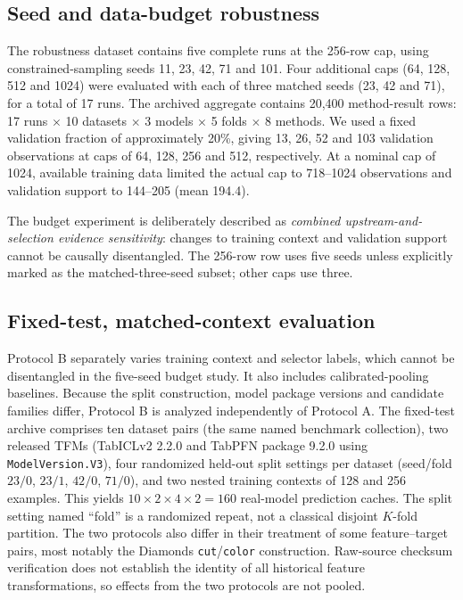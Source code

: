 \documentclass[a4paper,fleqn]{cas-sc}
\begin{document}
\subsection{Seed and data-budget robustness}
The robustness dataset contains five complete runs at the 256-row cap, using constrained-sampling seeds 11, 23, 42, 71 and 101. Four additional caps (64, 128, 512 and 1024) were evaluated with each of three matched seeds (23, 42 and 71), for a total of 17 runs. The archived aggregate contains 20,400 method-result rows: 17 runs $\times$ 10 datasets $\times$ 3 models $\times$ 5 folds $\times$ 8 methods. We used a fixed validation fraction of approximately 20\%, giving 13, 26, 52 and 103 validation observations at caps of 64, 128, 256 and 512, respectively. At a nominal cap of 1024, available training data limited the actual cap to 718--1024 observations and validation support to 144--205 (mean 194.4).

The budget experiment is deliberately described as \emph{combined upstream-and-selection evidence sensitivity}: changes to training context and validation support cannot be causally disentangled. The 256-row row uses five seeds unless explicitly marked as the matched-three-seed subset; other caps use three.


\subsection{Fixed-test, matched-context evaluation}
\label{sec:fixedtest}
Protocol B separately varies training context and selector labels, which cannot be disentangled in the five-seed budget study. It also includes calibrated-pooling baselines. Because the split construction, model package versions and candidate families differ, Protocol B is analyzed independently of Protocol A. The fixed-test archive comprises ten dataset pairs (the same named benchmark collection), two released TFMs (TabICLv2 2.2.0 and TabPFN package 9.2.0 using \texttt{ModelVersion.V3}), four randomized held-out split settings per dataset (seed/fold $23/0$, $23/1$, $42/0$, $71/0$), and two nested training contexts of 128 and 256 examples. This yields $10\times2\times4\times2=160$ real-model prediction caches. The split setting named ``fold'' is a randomized repeat, not a classical disjoint $K$-fold partition. The two protocols also differ in their treatment of some feature--target pairs, most notably the Diamonds \texttt{cut}/\texttt{color} construction. Raw-source checksum verification does not establish the identity of all historical feature transformations, so effects from the two protocols are not pooled.
\end{document}

